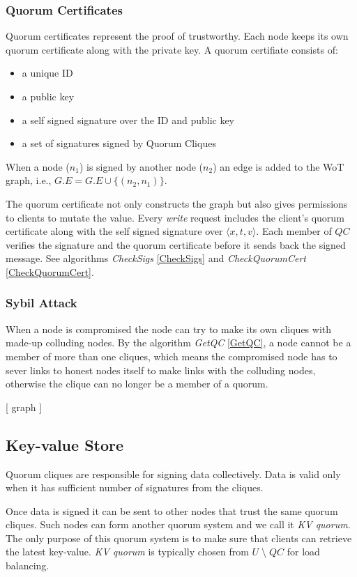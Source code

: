 \subsubsection*{Quorum Certificates}
Quorum certificates represent the proof of trustworthy. Each node
keeps its own quorum certificate along with the private key. 
A quorum certifiate consists of:
\begin{itemize}
\item a unique ID
\item a public key
\item a self signed signature over the ID and public key
\item a set of signatures signed by Quorum Cliques
\end{itemize}
When a node ($n_1$) is signed by another node ($n_2$) an edge is added
to the WoT graph, i.e., $G.E = G.E \cup \{(n_2, n_1)\}$.

The quorum certificate not only constructs the graph but also gives
permissions to clients to mutate the value.
Every {\em write} request includes the client's quorum certificate
along with the self signed signature over $\langle x, t, v
\rangle$. Each member of $QC$ verifies the signature and the quorum
certificate before it sends back the signed message. See algorithms
{\em CheckSigs} \ref{CheckSigs} and {\em
  CheckQuorumCert} \ref{CheckQuorumCert}.


\subsubsection*{Sybil Attack}
When a node is compromised the node can try to make its own cliques
with made-up colluding nodes. By the algorithm {\em GetQC}
\ref{GetQC}, a node cannot be a member of more than one cliques, which
means the compromised node has to sever links to honest nodes itself
to make links with the colluding nodes, otherwise the clique can no
longer be a member of a quorum.

[ graph ]

\subsection{Key-value Store}
Quorum cliques are responsible for signing data collectively. Data is
valid only when it has sufficient number of signatures from the
cliques. 

Once data is signed it can be sent to other nodes that trust the same
quorum cliques. Such nodes can form another quorum system and we call
it {\em KV quorum}. The only purpose of this quorum system is to make
sure that clients can retrieve the latest key-value. {\em KV quorum}
is typically chosen from $U\; \setminus\; QC$ for load balancing.

